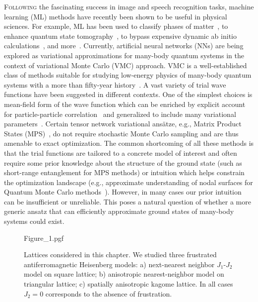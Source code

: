 \lettrine[lines=3]{F}{ollowing} the fascinating success in image and speech recognition tasks, machine learning (ML) methods have recently been shown to be useful in physical sciences. For example, ML has been used to classify phases of matter~\cite{carrasquilla2017machine}, to enhance quantum state tomography~\cite{torlai2018neural,sehayek2019learnability}, to bypass expensive dynamic ab initio calculations~\cite{brockherde2017bypassing}, and more~\cite{carleo2019machine}. Currently, artificial neural networks (NNs) are being explored as variational approximations for many-body quantum systems in the context of variational Monte Carlo (VMC) approach. VMC is a well-established class of methods suitable for studying low-energy physics of many-body quantum systems with a more than fifty-year history~\cite{McMillan}. A vast variety of trial wave functions have been suggested in different contexts. One of the simplest choices is mean-field form of the wave function which can be enriched by explicit account for particle-particle correlation~\cite{gros1988superconductivity,giamarchi1991phase,dev1992jastrow} and generalized to include many variational parameters~\cite{umrigar2005energy,schautz2004optimized,harju1997stochastic,capello2005variational}. Certain tensor network variational ans\"atze, e.g., Matrix Product States (MPS)~\cite{verstraete2006matrix}, do not require stochastic Monte Carlo sampling and are thus amenable to exact optimization. The common shortcoming of all these methods is that the trial functions are tailored to a concrete model of interest and often require some prior knowledge about the structure of the ground state (such as short-range entanglement for MPS methods) or intuition  which helps constrain the optimization landscape (e.g., approximate understanding of nodal surfaces for Quantum Monte Carlo methods~\cite{anderson1995fixed}). However, in many cases our prior intuition can be insufficient or unreliable. This poses a natural question of whether a more generic ansatz that can efficiently approximate ground states of many-body systems could exist.

\begin{figure*}[t]
    \centering
    {Figure_1.pgf}
    \caption{Lattices considered in this chapter. We studied three frustrated antiferromagnetic Heisenberg models: a) next-nearest neighbor $J_1$-$J_2$ model on square lattice; b) anisotropic nearest-neighbor model on triangular lattice; c) spatially anisotropic kagome lattice. In all cases $J_2=0$ corresponds to the absence of frustration.}
    \label{fig:nc20:models}
\end{figure*}


